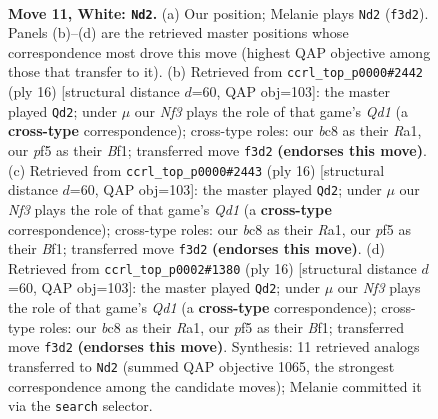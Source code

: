 \documentclass[11pt]{article}
\begin{document}
\clearpage

\begin{figure}[p]\centering
\begin{subfigure}{0.46\textwidth}\centering
\resizebox{\linewidth}{!}{%
\newchessgame
\chessboard[
  setfen={rnbqk2r/1p2p1b1/6p1/p1pB1p1p/3PP3/2P2N2/P4PPP/R1BQ1RK1 w kq - 0 11},
  showmover=false,
  pgfstyle=straightmove, color=movearrow, markmove={f3-d2}
]}
\caption{}
\end{subfigure}\hfill
\begin{subfigure}{0.46\textwidth}\centering
\resizebox{\linewidth}{!}{%
\newchessgame
\chessboard[
  setfen={rnb1k2r/pp2ppbp/6p1/q1p5/3PP3/2P1BN2/P4PPP/R2QKB1R w KQkq - 2 9},
  showmover=false,
  pgfstyle=straightmove, color=movearrow, markmove={d1-d2}
]}
\caption{}
\end{subfigure}
\\[4pt]
\begin{subfigure}{0.46\textwidth}\centering
\resizebox{\linewidth}{!}{%
\newchessgame
\chessboard[
  setfen={rnb1k2r/pp2ppbp/6p1/q1p5/3PP3/2P1BN2/P4PPP/R2QKB1R w KQkq - 2 9},
  showmover=false,
  pgfstyle=straightmove, color=movearrow, markmove={d1-d2}
]}
\caption{}
\end{subfigure}\hfill
\begin{subfigure}{0.46\textwidth}\centering
\resizebox{\linewidth}{!}{%
\newchessgame
\chessboard[
  setfen={rnb1k2r/pp2ppbp/6p1/q1p5/3PP3/2P1BN2/P4PPP/R2QKB1R w KQkq - 2 9},
  showmover=false,
  pgfstyle=straightmove, color=movearrow, markmove={d1-d2}
]}
\caption{}
\end{subfigure}
\caption{\textbf{Move 11, White: \texttt{Nd2}.} (a) Our position; Melanie plays \texttt{Nd2} (\texttt{f3d2}). Panels (b)--(d) are the retrieved master positions whose correspondence most drove this move (highest QAP objective among those that transfer to it). (b) Retrieved from \texttt{ccrl\_top\_p0000\#2442} (ply 16) [structural distance $d$=60, QAP obj=103]: the master played \texttt{Qd2}; under $\mu$ our \emph{Nf3} plays the role of that game's \emph{Qd1} (a \textbf{cross-type} correspondence); cross-type roles: our \emph{b}c8 as their \emph{R}a1, our \emph{p}f5 as their \emph{B}f1; transferred move \texttt{f3d2} \textbf{(endorses this move)}. (c) Retrieved from \texttt{ccrl\_top\_p0000\#2443} (ply 16) [structural distance $d$=60, QAP obj=103]: the master played \texttt{Qd2}; under $\mu$ our \emph{Nf3} plays the role of that game's \emph{Qd1} (a \textbf{cross-type} correspondence); cross-type roles: our \emph{b}c8 as their \emph{R}a1, our \emph{p}f5 as their \emph{B}f1; transferred move \texttt{f3d2} \textbf{(endorses this move)}. (d) Retrieved from \texttt{ccrl\_top\_p0002\#1380} (ply 16) [structural distance $d$=60, QAP obj=103]: the master played \texttt{Qd2}; under $\mu$ our \emph{Nf3} plays the role of that game's \emph{Qd1} (a \textbf{cross-type} correspondence); cross-type roles: our \emph{b}c8 as their \emph{R}a1, our \emph{p}f5 as their \emph{B}f1; transferred move \texttt{f3d2} \textbf{(endorses this move)}. Synthesis: 11 retrieved analogs transferred to \texttt{Nd2} (summed QAP objective 1065, the strongest correspondence among the candidate moves); Melanie committed it via the \texttt{search} selector.}
\label{fig:thought-m20}
\end{figure}
\end{document}

